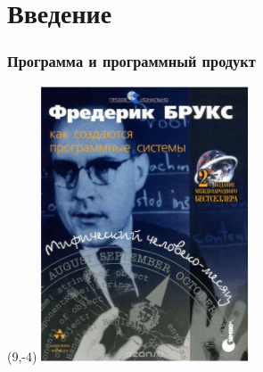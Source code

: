 \documentclass{../cscslides}
\begin{document}
    \section{Введение}

    \begin{frame}
        \frametitle{Программа и программный продукт}
        \begin{textblock}{2}(9,-4)
            \includegraphics[width=\textwidth]{brooksCover}
        \end{textblock}
    \end{frame}
\end{document}
